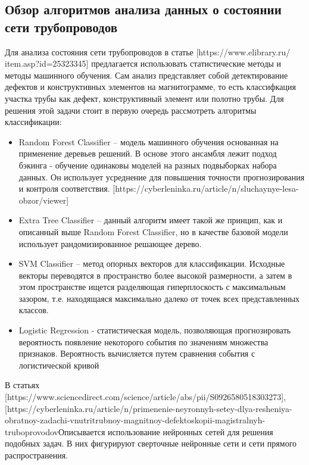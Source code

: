 \documentclass[a4paper,article,14pt]{extarticle}
\begin{document}
\subsection{Обзор алгоритмов анализа данных о состоянии сети трубопроводов}

Для анализа состояния сети трубопроводов в статье [https://www.elibrary.ru/ item.asp?id=25323345] предлагается использовать 
статистические методы и методы машинного обучения. Сам анализ представляет собой детектирование дефектов и 
конструктивных элементов на магнитограмме, то есть классифкация участка трубы как дефект, конструктивный 
элемент или полотно трубы. Для решения этой задачи стоит в первую очередь рассмотреть алгоритмы классификации:

\begin{itemize}
    \item Random Forest Classifier – модель машинного обучения основанная на применение деревьев решений. В основе этого ансамбля лежит подход бэкинга - обучение одинаковы моделей на разных подвыборках набора данных. Он использует усреднение для повышения точности прогнозирования и контроля соответствия. [https://cyberleninka.ru/article/n/sluchaynye-lesa-obzor/viewer]
    \item Extra Tree Classifier – данный алгоритм имеет такой же принцип, как и описанный выше Random Forest Classifier, но в качестве базовой модели использует рандомизированное решающее дерево. 
    \item SVM Classifier – метод опорных векторов для классификации. Исходные векторы переводятся в пространство более высокой размерности, а затем в этом пространстве ищется разделяющая гиперплоскость с максимальным зазором, т.е. находящаяся максимально далеко от точек всех представленных классов. 
    \item Logistic Regression - статистическая модель, позволяющая прогнозировать вероятность появление некоторого события по значениям множества признаков. Вероятность вычисляется путем сравнения события с логистической кривой 
\end{itemize}

В статьях  [https://www.sciencedirect.com/science/article/abs/pii/S0926580518303273], [https://cyberleninka.ru/article/n/primenenie-neyronnyh-setey-dlya-resheniya-obratnoy-zadachi-vnutritrubnoy-magnitnoy-defektoskopii-magistralnyh-truboprovodovОписывается использование нейронных сетей для решения подобных задач. В них фигурируют сверточные нейронные сети и сети прямого распространения.
\end{document}
